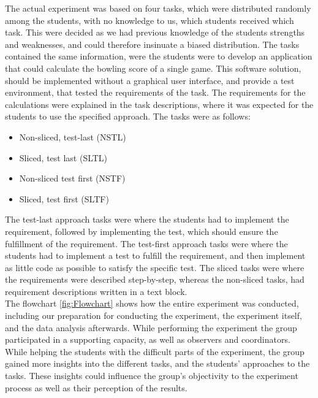 \documentclass{sig-alternate-05-2015}
\begin{document}
The actual experiment was based on four tasks, which were distributed randomly among the students, with no knowledge to us, which students received which task. This were decided as we had previous knowledge of the students strengths and weaknesses, and could therefore insinuate a biased distribution. The tasks contained the same information, were the students were to develop an application that could calculate the bow\-ling score of a single game. This software solution, should be implemented without a graphical user interface, and provide a test environment, that tested the requirements of the task. The requirements for the calculations were explained in the task descriptions, where it was expected for the students to use the specified approach.
The tasks were as follows:
\begin{itemize}
\item Non-sliced, test-last (NSTL)
\item Sliced, test last (SLTL)
\item Non-sliced test first (NSTF)
\item Sliced, test first (SLTF)
\end{itemize}
The test-last approach tasks were where the students had to implement the requirement, followed by implementing the test, which should ensure the fulfillment of the requirement.
The test-first approach tasks were where the students had to implement a test to fulfill the requirement, and then implement as little code as possible to satisfy the specific test.
The sliced tasks were where the requirements were described step-by-step, whereas the non-sliced tasks, had requirement descriptions written in a text block.\\



The flowchart \ref{fig:Flowchart} shows how the entire experiment was conducted, including our preparation for conducting the experiment, the experiment itself, and the data analysis afterwards.
While performing the experiment the group participated in a supporting capacity, as well as observers and coordinators. While helping the students with the difficult parts of the experiment, the group gained more insights into the different tasks, and the students' approaches to the tasks. These insights could influence the group's objectivity to the experiment process as well as their perception of the results.
\end{document}

